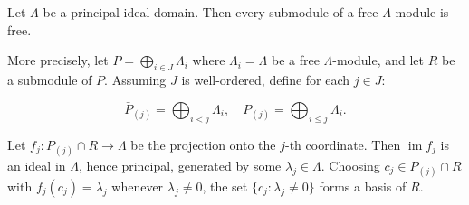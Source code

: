 Let $\Lambda$ be a principal ideal domain. Then every submodule of a free $\Lambda$-module is free.

More precisely, let $P = \bigoplus_{i \in J} \Lambda_i$ where $\Lambda_i = \Lambda$ be a free $\Lambda$-module, and let $R$ be a submodule of $P$. Assuming $J$ is well-ordered, define for each $j \in J$:

$$\bar{P}_{(j)} = \bigoplus_{i < j} \Lambda_i, \quad P_{(j)} = \bigoplus_{i \leq j} \Lambda_i.$$

Let $f_j : P_{(j)} \cap R \rightarrow \Lambda$ be the projection onto the $j$-th coordinate. Then $\operatorname{im} f_j$ is an ideal in $\Lambda$, hence principal, generated by some $\lambda_j \in \Lambda$. Choosing $c_j \in P_{(j)} \cap R$ with $f_j(c_j) = \lambda_j$ whenever $\lambda_j \neq 0$, the set $\{c_j : \lambda_j \neq 0\}$ forms a basis of $R$.
